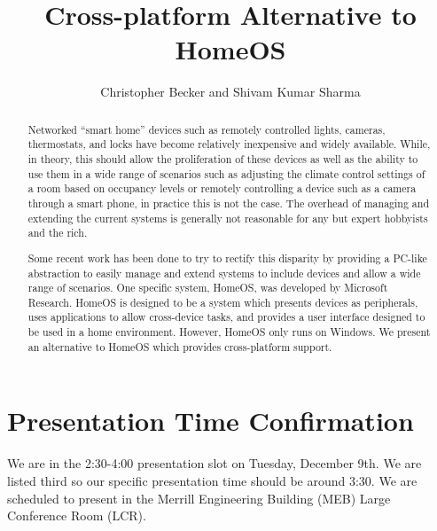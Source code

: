 \documentclass[letterpaper,12pt]{article}
\title{Cross-platform Alternative to HomeOS}
\author{Christopher Becker and Shivam Kumar Sharma}
\begin{document}
\maketitle

\begin{abstract}
Networked “smart home” devices such as remotely controlled lights, cameras, thermostats, and locks have become relatively inexpensive and widely available.  While, in theory, this should allow the proliferation of these devices as well as the ability to use them in a wide range of scenarios such as adjusting the climate control settings of a room based on occupancy levels or remotely controlling a device such as a camera through a smart phone, in practice this is not the case.  The overhead of managing and extending the current systems is generally not reasonable for any but expert hobbyists and the rich.

Some recent work has been done to try to rectify this disparity by providing a PC-like abstraction to easily manage and extend systems to include devices and allow a wide range of scenarios.  One specific system, HomeOS, was developed by Microsoft Research.  HomeOS is designed to be a system which presents devices as peripherals, uses applications to allow cross-device tasks, and provides a user interface designed to be used in a home environment.  However, HomeOS only runs on Windows.  We present an alternative to HomeOS which provides cross-platform support.
\end{abstract}


\section{Presentation Time Confirmation}
We are in the 2:30-4:00 presentation slot on Tuesday, December 9th.  We are
listed third so our specific presentation time should be around 3:30.  We are
scheduled to present in the Merrill Engineering Building (MEB) Large Conference
Room (LCR).

%
%
\end{document}
